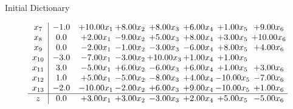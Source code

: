 \documentclass[8pt]{article}
\begin{document}
Initial Dictionary 

\[\begin{array}{c| c c@{\hskip 2pt} c@{\hskip 2pt} c@{\hskip 2pt} c@{\hskip 2pt} c@{\hskip 2pt} c@{\hskip 2pt} }
 x_{7}   &  -1.0 & + 10.00 x_{1} & +  8.00 x_{2} & +  8.00 x_{3} & +  6.00 x_{4} & +  1.00 x_{5} & +  9.00 x_{6}\\
 x_{8}   &  0.0 & +  2.00 x_{1} & -9.00 x_{2} & +  5.00 x_{3} & +  8.00 x_{4} & +  3.00 x_{5} & + 10.00 x_{6}\\
 x_{9}   &  0.0 & -2.00 x_{1} & -1.00 x_{2} & -3.00 x_{3} & -6.00 x_{4} & +  8.00 x_{5} & +  4.00 x_{6}\\
 x_{10}   &  -3.0 & -7.00 x_{1} & -3.00 x_{2} & + 10.00 x_{3} & +  1.00 x_{4} & +  1.00 x_{5} &   \\
 x_{11}   &  3.0 & -5.00 x_{1} & +  6.00 x_{2} & -6.00 x_{3} & +  6.00 x_{4} & +  1.00 x_{5} & +  3.00 x_{6}\\
 x_{12}   &  1.0 & +  5.00 x_{1} & -5.00 x_{2} & -8.00 x_{3} & +  4.00 x_{4} & -10.00 x_{5} & -7.00 x_{6}\\
 x_{13}   &  -2.0 & -10.00 x_{1} & -2.00 x_{2} & +  6.00 x_{3} & +  9.00 x_{4} & -10.00 x_{5} & +  1.00 x_{6}\\
\hline
z    &  0.0 & +  3.00 x_{1} & +  3.00 x_{2} & -3.00 x_{3} & +  2.00 x_{4} & +  5.00 x_{5} & -5.00 x_{6}\\
\end{array}\]
\end{document}
